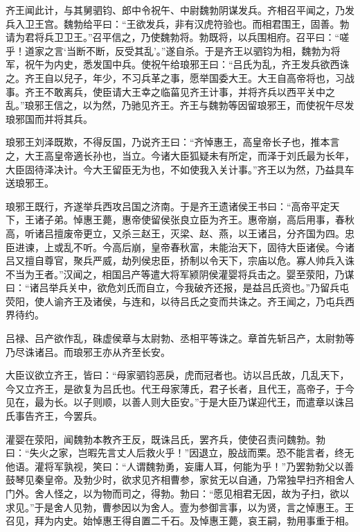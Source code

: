 \documentclass[12pt,UTF8]{ctexbook}
\begin{document}
齐王闻此计，与其舅驷钧、郎中令祝午、中尉魏勃阴谋发兵。齐相召平闻之，乃发兵入卫王宫。魏勃给平曰：“王欲发兵，非有汉虎符验也。而相君围王，固善。勃请为君将兵卫卫王。”召平信之，乃使魏勃将。勃既将，以兵围相府。召平曰：“嗟乎！道家之言‘当断不断，反受其乱’。”遂自杀。于是齐王以驷钧为相，魏勃为将军，祝午为内史，悉发国中兵。使祝午给琅邪王曰：“吕氏为乱，齐王发兵欲西诛之。齐王自以兒子，年少，不习兵革之事，愿举国委大王。大王自高帝将也，习战事。齐王不敢离兵，使臣请大王幸之临菑见齐王计事，并将齐兵以西平关中之乱。”琅邪王信之，以为然，乃驰见齐王。齐王与魏勃等因留琅邪王，而使祝午尽发琅邪国而并将其兵。



琅邪王刘泽既欺，不得反国，乃说齐王曰：“齐悼惠王，高皇帝长子也，推本言之，大王高皇帝適长孙也，当立。今诸大臣狐疑未有所定，而泽于刘氏最为长年，大臣固待泽决计。今大王留臣无为也，不如使我入关计事。”齐王以为然，乃益具车送琅邪王。



琅邪王既行，齐遂举兵西攻吕国之济南。于是齐王遗诸侯王书曰：“高帝平定天下，王诸子弟。悼惠王薨，惠帝使留侯张良立臣为齐王。惠帝崩，高后用事，春秋高，听诸吕擅废帝更立，又杀三赵王，灭梁、赵、燕，以王诸吕，分齐国为四。忠臣进谏，上或乱不听。今高后崩，皇帝春秋富，未能治天下，固待大臣诸侯。今诸吕又擅自尊官，聚兵严威，劫列侯忠臣，挢制以令天下，宗庙以危。寡人帅兵入诛不当为王者。”汉闻之，相国吕产等遣大将军颍阴侯灌婴将兵击之。婴至荥阳，乃谋曰：“诸吕举兵关中，欲危刘氏而自立，今我破齐还报，是益吕氏资也。”乃留兵屯荧阳，使人谕齐王及诸侯，与连和，以待吕氏之变而共诛之。齐王闻之，乃屯兵西界待约。



吕禄、吕产欲作乱，硃虚侯章与太尉勃、丞相平等诛之。章首先斩吕产，太尉勃等乃尽诛诸吕。而琅邪王亦从齐至长安。



大臣议欲立齐王，皆曰：“母家驷钧恶戾，虎而冠者也。访以吕氏故，几乱天下，今又立齐王，是欲复为吕氏也。代王母家薄氏，君子长者，且代王，高帝子，于今见在，最为长。以子则顺，以善人则大臣安。”于是大臣乃谋迎代王，而遣章以诛吕氏事告齐王，今罢兵。



灌婴在荥阳，闻魏勃本教齐王反，既诛吕氏，罢齐兵，使使召责问魏勃。勃曰：“失火之家，岂暇先言丈人后救火乎！”因退立，股战而栗。恐不能言者，终无他语。灌将军孰视，笑曰：“人谓魏勃勇，妄庸人耳，何能为乎！”乃罢勃勃父以善鼓琴见秦皇帝。及勃少时，欲求见齐相曹参，家贫无以自通，乃常独早扫齐相舍人门外。舍人怪之，以为物而司之，得勃。勃曰：“愿见相君无因，故为子扫，欲以求见。”于是舍人见勃，曹参因以为舍人。壹为参御言事，以为贤，言之悼惠王。王召见，拜为内史。始悼惠王得自置二千石。及悼惠王薨，哀王嗣，勃用事重于相。
\end{document}
